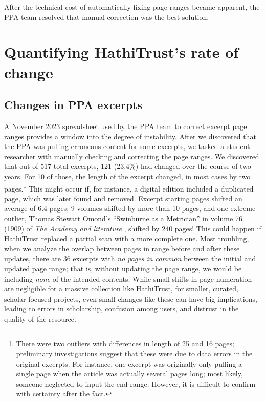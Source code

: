 \documentclass[final]{anthology-ch} %
\begin{document}
After the technical cost of automatically fixing page ranges became apparent, the PPA team resolved that manual correction was the best solution.

\section{Quantifying HathiTrust's rate of change}

\subsection{Changes in PPA excerpts}\label{sec:ppa-excerpt-changes}

A November 2023 spreadsheet used by the PPA team to correct excerpt page ranges provides a window into the degree of instability. After we discovered that the PPA was pulling erroneous content for some excerpts, we tasked a student researcher with manually checking and correcting the page ranges. We discovered that out of 517 total excerpts, 121 (23.4\%) had changed over the course of two years. For 10 of those, the length of the excerpt changed, in most cases by two pages.\footnote{There were two outliers with differences in length of 25 and 16 pages; preliminary investigations suggest that these were due to data errors in the original excerpts. For instance, one excerpt was originally only pulling a single page when the article was actually several pages long; most likely, someone neglected to input the end range. However, it is difficult to confirm with certainty after the fact.} This might occur if, for instance, a digital edition included a duplicated page, which was later found and removed. Excerpt starting pages shifted an average of 6.4 pages; 9 volumes shifted by more than 10 pages, and one extreme outlier, Thomas Stewart Omond's ``Swinburne as a Metrician'' in volume 76 (1909) of \textit{The Academy and literature} \cite{omond_thomas_stewart_swinburne_1909}, shifted by 240 pages! This could happen if HathiTrust replaced a partial scan with a more complete one. Most troubling, when we analyze the overlap between pages in range before and after these updates, there are 36 excerpts with \textit{no pages in common} between the initial and updated page range; that is, without updating the page range, we would be including \textit{none} of the intended contents. While small shifts in page numeration are negligible for a massive collection like HathiTrust, for smaller, curated, scholar-focused projects, even small changes like these can have big implications, leading to errors in scholarship, confusion among users, and distrust in the quality of the resource.
\end{document}

